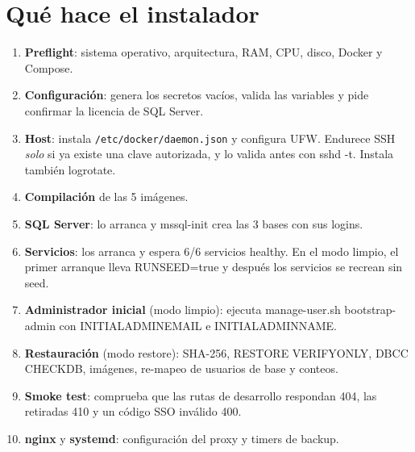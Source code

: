 \documentclass[11pt,a4paper,oneside]{report}
\newcommand{\codus}{\textunderscore\allowbreak}
\DeclareRobustCommand{\cod}[1]{{\small\ttfamily\let\_\codus #1}}
\DeclareRobustCommand{\ruta}[1]{{\small\nolinkurl{#1}}}
\begin{document}
\section{Qué hace el instalador}
\begin{enumerate}
  \item \textbf{Preflight}: sistema operativo, arquitectura, RAM, CPU, disco, Docker y Compose.
  \item \textbf{Configuración}: genera los secretos vacíos, valida las variables y pide confirmar la licencia de SQL Server.
  \item \textbf{Host}: instala \ruta{/etc/docker/daemon.json} y configura UFW. Endurece SSH \emph{solo} si ya existe una clave autorizada, y lo valida antes con \cod{sshd -t}. Instala también logrotate.
  \item \textbf{Compilación} de las 5 imágenes.
  \item \textbf{SQL Server}: lo arranca y \cod{mssql-init} crea las 3 bases con sus logins.
  \item \textbf{Servicios}: los arranca y espera \cod{6/6 servicios healthy}. En el modo limpio,
        el primer arranque lleva \cod{RUN\_SEED=true} y después los servicios se recrean sin seed.
  \item \textbf{Administrador inicial} (modo limpio): ejecuta \cod{manage-user.sh bootstrap-admin} con
        \cod{INITIAL\_ADMIN\_EMAIL} e \cod{INITIAL\_ADMIN\_NAME}.
  \item \textbf{Restauración} (modo restore): SHA-256, \cod{RESTORE VERIFYONLY}, \cod{DBCC CHECKDB}, imágenes, re-mapeo de usuarios de base y conteos.
  \item \textbf{Smoke test}: comprueba que las rutas de desarrollo respondan 404, las retiradas 410 y un código SSO inválido 400.
  \item \textbf{nginx} y \textbf{systemd}: configuración del proxy y timers de backup.
\end{enumerate}
\end{document}

